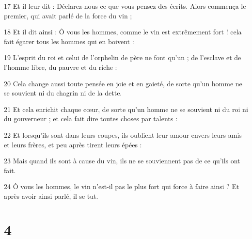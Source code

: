 \par 17 Et il leur dit : Déclarez-nous ce que vous pensez des écrits. Alors commença le premier, qui avait parlé de la force du vin ;
\par 18 Et il dit ainsi : Ô vous les hommes, comme le vin est extrêmement fort ! cela fait égarer tous les hommes qui en boivent :
\par 19 L'esprit du roi et celui de l'orphelin de père ne font qu'un ; de l'esclave et de l'homme libre, du pauvre et du riche :
\par 20 Cela change aussi toute pensée en joie et en gaieté, de sorte qu'un homme ne se souvient ni du chagrin ni de la dette.
\par 21 Et cela enrichit chaque cœur, de sorte qu'un homme ne se souvient ni du roi ni du gouverneur ; et cela fait dire toutes choses par talents :
\par 22 Et lorsqu'ils sont dans leurs coupes, ils oublient leur amour envers leurs amis et leurs frères, et peu après tirent leurs épées :
\par 23 Mais quand ils sont à cause du vin, ils ne se souviennent pas de ce qu'ils ont fait.
\par 24 Ô vous les hommes, le vin n'est-il pas le plus fort qui force à faire ainsi ? Et après avoir ainsi parlé, il se tut.

\chapter{4}

